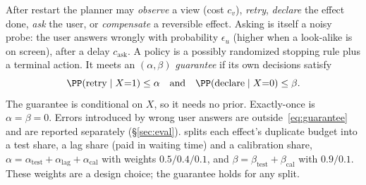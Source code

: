 After restart the planner may \emph{observe} a view (cost $c_v$), \emph{retry}, \emph{declare} the effect done, \emph{ask} the user, or \emph{compensate} a
reversible effect. Asking is itself a noisy probe: the user answers wrongly with probability $\epsilon_u$ (higher when a look-alike is on screen), after a delay
$c_{\mathrm{ask}}$. A policy is a possibly randomized stopping rule plus a terminal action. It meets an $(\alpha,\beta)$ \emph{guarantee} if its own
decisions satisfy
\begin{equation}
\PP(\text{retry}\mid X{=}1)\le\alpha \quad\text{and}\quad \PP(\text{declare}\mid X{=}0)\le\beta .
\label{eq:guarantee}
\end{equation}
The guarantee is conditional on $X$, so it needs no prior. Exactly-once is $\alpha{=}\beta{=}0$. Errors introduced by wrong user answers are outside~\eqref{eq:guarantee}
and are reported separately (\S\ref{sec:eval}). \sys splits each effect's duplicate budget into a test share, a lag share (paid in waiting time) and a calibration share,
$\alpha=\alpha_{\mathrm{test}}+\alpha_{\mathrm{lag}}+\alpha_{\mathrm{cal}}$ with weights $0.5/0.4/0.1$, and $\beta=\beta_{\mathrm{test}}+\beta_{\mathrm{cal}}$ with $0.9/0.1$. These weights are
a design choice; the guarantee holds for any split.
